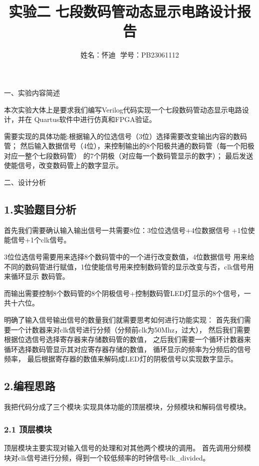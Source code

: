 \documentclass[12pt]{article}
\title{实验二\,\,七段数码管动态显示电路设计报告}
\author{姓名：怀迪\,\, 学号：PB23061112 \\ }
\date{}
\begin{document}
\maketitle

\begin{highlightedsection}{}
    一、实验内容简述
\end{highlightedsection}
本次实验大体上是要求我们编写Verilog代码实现一个七段数码管动态显示电路设计，并在
Quartus软件中进行仿真和FPGA验证。

需要实现的具体功能:根据输入的位选信号（3位）选择需要改变输出内容的数码管；
然后输入数据信号（4位），来控制输出的8个阳极共通的数码管（每一个阳极对应一整个七段数码管）
的7个阴极（对应每一个数码管显示的数字）；
最后发送使能信号，改变数码管上的数字显示。



\begin{highlightedsection}{}
    二、设计分析
\end{highlightedsection}
\subsection*{1.实验题目分析}
首先我们需要确认输入输出信号一共需要8位：3位位选信号+4位数据信号
+1位使能信号+1个clk信号。

3位位选信号需要用来选择8个数码管中的一个进行改变数值，4位数据信号
用来给不同的数码管进行赋值，1位使能信号用来控制数码管的显示改变与否，clk信号用来循环显示
数码管。

而输出需要控制8个数码管的8个阴极信号+控制数码管LED灯显示的8个信号，一共十六位。

明确了输入信号输出信号的数量我们就需要思考如何进行功能实现：
首先我们需要一个计数器来对clk信号进行分频（分频前clk为50Mhz，过大），
然后我们需要根据位选信号选择寄存器来存储数码管的数值，
之后我们需要一个循环计数器来循环选择数码管显示其对应寄存器存储的数值，
循环显示的频率为分频后的信号频率，
最后根据寄存器的数值来解码成LED灯的阴极信号以实现数字显示。

\subsection*{2.编程思路}
我把代码分成了三个模块:实现具体功能的顶层模块，分频模块和解码信号模块。
\subsubsection*{2.1 顶层模块}
顶层模块主要实现对输入信号的处理和对其他两个模块的调用。
首先调用分频模块对clk信号进行分频，得到一个较低频率的时钟信号clk\_divided。
\end{document}
